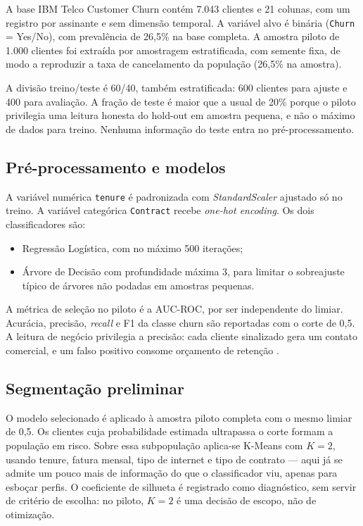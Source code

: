 \documentclass[12pt]{article}
\begin{document}
A base IBM Telco Customer Churn \cite{ibm2018} contém 7.043 clientes e 21
colunas, com um registro por assinante e sem dimensão temporal. A variável
alvo é binária (\texttt{Churn} = Yes/No), com prevalência de 26,5\% na base
completa. A amostra piloto de 1.000 clientes foi extraída por amostragem
estratificada, com semente fixa, de modo a reproduzir a taxa de
cancelamento da população (26,5\% na amostra).

A divisão treino/teste é 60/40, também estratificada: 600 clientes para
ajuste e 400 para avaliação. A fração de teste é maior que a usual de 20\%
porque o piloto privilegia uma leitura honesta do hold-out em amostra
pequena, e não o máximo de dados para treino. Nenhuma informação do teste
entra no pré-processamento.

\subsection{Pré-processamento e modelos}

A variável numérica \texttt{tenure} é padronizada com
\textit{StandardScaler} ajustado só no treino. A variável categórica
\texttt{Contract} recebe \textit{one-hot encoding}. Os dois classificadores
são:

\begin{itemize}
  \item Regressão Logística, com no máximo 500 iterações;
  \item Árvore de Decisão com profundidade máxima 3, para limitar o
        sobreajuste típico de árvores não podadas em amostras pequenas.
\end{itemize}

A métrica de seleção no piloto é a AUC-ROC, por ser independente do limiar.
Acurácia, precisão, \textit{recall} e F1 da classe churn são reportadas com
o corte de 0,5. A leitura de negócio privilegia a precisão: cada cliente
sinalizado gera um contato comercial, e um falso positivo consome orçamento
de retenção \cite{verbeke2012}.

\subsection{Segmentação preliminar}

O modelo selecionado é aplicado à amostra piloto completa com o mesmo limiar
de 0,5. Os clientes cuja probabilidade estimada ultrapassa o corte formam a
população em risco. Sobre essa subpopulação aplica-se K-Means com $K = 2$,
usando tenure, fatura mensal, tipo de internet e tipo de contrato --- aqui
já se admite um pouco mais de informação do que o classificador viu, apenas
para esboçar perfis. O coeficiente de silhueta \cite{rousseeuw1987} é
registrado como diagnóstico, sem servir de critério de escolha: no piloto,
$K = 2$ é uma decisão de escopo, não de otimização.
\end{document}
